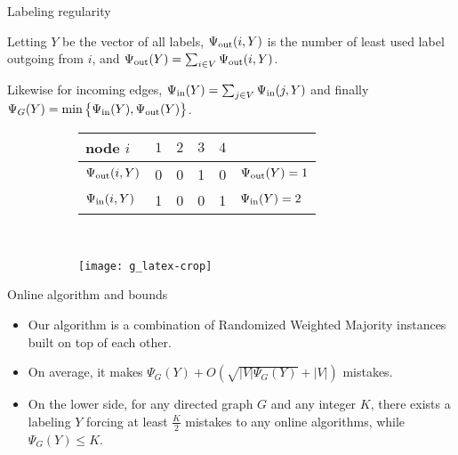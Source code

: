 \documentclass[10pt,svgnames,ignorenonframetext,final]{beamer}
\providecommand{\largelist}{%
  \setlength{\itemsep}{8pt}\setlength{\parskip}{3pt}}
\begin{document}
\begin{frame}{Labeling regularity}


Letting $Y$ be the vector of all labels, $\Psi_{\mathrm{out}}(i, Y)$ is the number of least used label outgoing
from $i$, and $\Psi_{\mathrm{out}}(Y) = \sum_{i \in V} \Psi_{\mathrm{out}}(i,Y)$.

Likewise for incoming edges, \(\Psi_{\mathrm{in}}(Y) = \sum_{j \in V} \Psi_{\mathrm{in}}(j,Y)\) and finally
\(\Psi_G(Y) = \min\big\{\Psi_{\mathrm{in}}(Y), \Psi_{\mathrm{out}}(Y)\big\}\).

\begin{figure}[t]
  \centering
  \begin{subfigure}[t]{0.6\textwidth}
    \centering
    \vspace{-2cm}
    \begin{tabular}{lcccc|l}
      \toprule
      node $i$        & $1$ & $2$ & $3$ & $4$ &                  \\
      \midrule
      $\Psi_{\mathrm{out}}(i, Y)$ & 0   & 0   & 1   & 0   & $\Psi_{\mathrm{out}}(Y) = 1$  \\
      $\Psi_{\mathrm{in}}(i, Y)$  & 1   & 0   & 0   & 1   & $\Psi_{\mathrm{in}}(Y) = 2$ \\
      \bottomrule
    \end{tabular}
  \end{subfigure}~
  \begin{subfigure}[t]{0.35\textwidth}
    \centering \texttt{[image: g\_latex-crop]}
  \end{subfigure}
\end{figure}

\end{frame}

\begin{frame}{Online algorithm and bounds}
  \begin{itemize}[<+->]
    \largelist
  \item 
    Our algorithm is a combination of Randomized Weighted Majority instances built on top of each other. 

  \item 
    On average, it makes $\Psi_G(Y) + O\left(\sqrt{|V|\Psi_G(Y)} + |V|\right)$ mistakes.

  \item 
    On the lower side,
    for any directed graph $G$ and any integer $K$,
    there exists a labeling $Y$ forcing at least $\frac{K}{2}$ mistakes to any online algorithms,
    while $\Psi_G(Y) \leq K$.
\end{itemize}

\end{frame}
\end{document}
